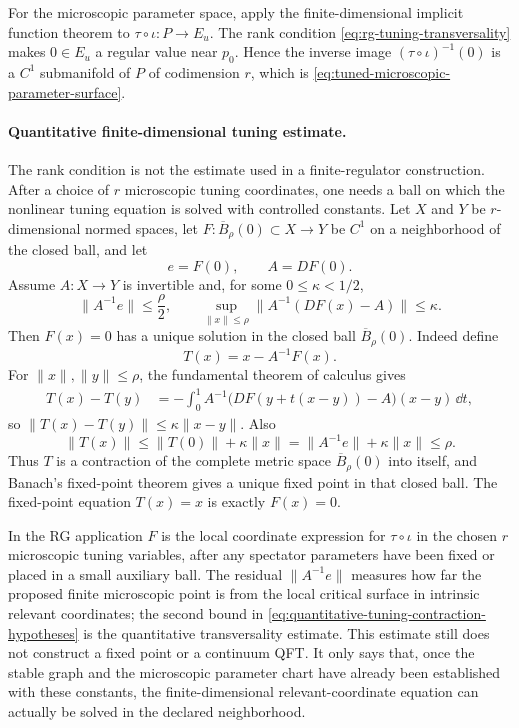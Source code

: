 For the microscopic parameter space, apply the finite-dimensional implicit
function theorem to \(\tau\circ\iota:P\to E_u\).  The rank condition
\eqref{eq:rg-tuning-transversality} makes \(0\in E_u\) a regular value near
\(p_0\).  Hence the inverse image
\((\tau\circ\iota)^{-1}(0)\) is a \(C^1\) submanifold of \(P\) of codimension
\(r\), which is \eqref{eq:tuned-microscopic-parameter-surface}.

\paragraph{Quantitative finite-dimensional tuning estimate.}
The rank condition is not the estimate used in a finite-regulator
construction.  After a choice of \(r\) microscopic tuning coordinates,
one needs a ball on which the nonlinear tuning equation is solved with
controlled constants.  Let \(X\) and \(Y\) be \(r\)-dimensional normed
spaces, let \(F:\overline B_\rho(0)\subset X\to Y\) be \(C^1\) on a
neighborhood of the closed ball, and let
\[
  e=F(0),\qquad A=DF(0).
\]
Assume \(A:X\to Y\) is invertible and, for some \(0\leq\kappa<1/2\),
\begin{equation}
  \|A^{-1}e\|\leq\frac{\rho}{2},
  \qquad
  \sup_{\|x\|\leq\rho}\|A^{-1}(DF(x)-A)\|\leq\kappa .
  \label{eq:quantitative-tuning-contraction-hypotheses}
\end{equation}
Then \(F(x)=0\) has a unique solution in the closed ball
\(\overline B_\rho(0)\).  Indeed define
\[
  T(x)=x-A^{-1}F(x).
\]
For \(\|x\|,\|y\|\leq\rho\), the fundamental theorem of calculus gives
\begin{align}
  T(x)-T(y)
  &=
  -\int_0^1
  A^{-1}\bigl(DF(y+t(x-y))-A\bigr)(x-y)\,\dd t ,
  \label{eq:tuning-contraction-difference}
\end{align}
so \(\|T(x)-T(y)\|\leq\kappa\|x-y\|\).  Also
\[
  \|T(x)\|
  \leq
  \|T(0)\|+\kappa\|x\|
  =
  \|A^{-1}e\|+\kappa\|x\|
  \leq
  \rho .
\]
Thus \(T\) is a contraction of the complete metric space
\(\overline B_\rho(0)\) into itself, and Banach's fixed-point theorem gives
a unique fixed point in that closed ball.  The fixed-point equation
\(T(x)=x\) is exactly \(F(x)=0\).

In the RG application \(F\) is the local coordinate expression for
\(\tau\circ\iota\) in the chosen \(r\) microscopic tuning variables, after
any spectator parameters have been fixed or placed in a small auxiliary
ball.  The residual \(\|A^{-1}e\|\) measures how far the proposed finite
microscopic point is from the local critical surface in intrinsic relevant
coordinates; the second bound in
\eqref{eq:quantitative-tuning-contraction-hypotheses} is the quantitative
transversality estimate.  This estimate still does not construct a fixed
point or a continuum QFT.  It only says that, once the stable graph and the
microscopic parameter chart have already been established with these
constants, the finite-dimensional relevant-coordinate equation can actually
be solved in the declared neighborhood.

